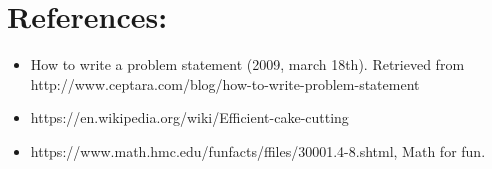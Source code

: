 \documentclass[12pt]{report}
\begin{document}
	\section{References:}
	\begin{itemize}
		\item {How to write a problem statement (2009, march 18th). Retrieved from   http://www.ceptara.com/blog/how-to-write-problem-statement}
		
		\item {https://en.wikipedia.org/wiki/Efficient-cake-cutting}
		\item https://www.math.hmc.edu/funfacts/ffiles/30001.4-8.shtml, Math for fun.
	\end{itemize}
	
	
	
\end{document}
